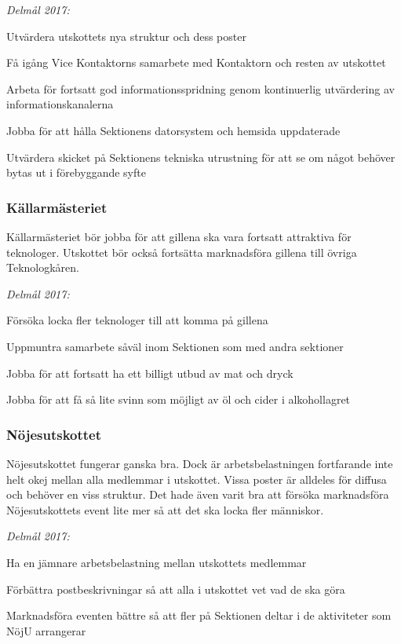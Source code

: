 \documentclass[10pt]{article}
\begin{document}
\emph{Delmål 2017:}
\begin{dashlist}
    \item Utvärdera utskottets nya struktur och dess poster
    \item Få igång Vice Kontaktorns samarbete med Kontaktorn och resten av utskottet
    \item Arbeta för fortsatt god informationsspridning genom kontinuerlig utvärdering av informationskanalerna
    \item Jobba för att hålla Sektionens datorsystem och hemsida uppdaterade
    \item Utvärdera skicket på Sektionens tekniska utrustning för att se om något behöver bytas ut i förebyggande syfte
\end{dashlist}

\subsubsection*{Källarmästeriet}
Källarmästeriet bör jobba för att gillena ska vara fortsatt attraktiva för teknologer. Utskottet bör också fortsätta marknadsföra gillena till övriga Teknologkåren.

\emph{Delmål 2017:}
\begin{dashlist}
    \item Försöka locka fler teknologer till att komma på gillena
    \item Uppmuntra samarbete såväl inom Sektionen som med andra sektioner
    \item Jobba för att fortsatt ha ett billigt utbud av mat och dryck
    \item Jobba för att få så lite svinn som möjligt av öl och cider i alkohollagret
\end{dashlist}

\subsubsection*{Nöjesutskottet}
Nöjesutskottet fungerar ganska bra. Dock är arbetsbelastningen fortfarande inte helt okej mellan alla medlemmar i utskottet. Vissa poster är alldeles för diffusa och behöver en viss struktur. Det hade även varit bra att försöka marknadsföra Nöjesutskottets event lite mer så att det ska locka fler människor.

\emph{Delmål 2017:}
\begin{dashlist}
    \item Ha en jämnare arbetsbelastning mellan utskottets medlemmar
    \item Förbättra postbeskrivningar så att alla i utskottet vet vad de ska göra
    \item Marknadsföra eventen bättre så att fler på Sektionen deltar i de aktiviteter som NöjU arrangerar
\end{dashlist}
\end{document}
